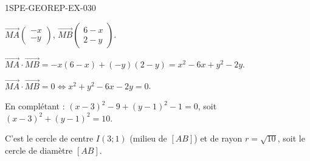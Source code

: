 \begin{corrige}{1SPE-GEOREP-EX-030}

$\vec{MA}\begin{pmatrix} -x \\ -y \end{pmatrix}$, $\vec{MB}\begin{pmatrix} 6-x \\ 2-y \end{pmatrix}$.

$\vec{MA} \cdot \vec{MB} = -x(6-x) + (-y)(2-y) = x^2 - 6x + y^2 - 2y$.

$\vec{MA} \cdot \vec{MB} = 0 \iff x^2 + y^2 - 6x - 2y = 0$.

En complétant : $(x-3)^2 - 9 + (y-1)^2 - 1 = 0$, soit $(x-3)^2 + (y-1)^2 = 10$.

C'est le cercle de centre $I(3 ; 1)$ (milieu de $[AB]$) et de rayon $r = \sqrt{10}$, soit le cercle de diamètre $[AB]$.

\end{corrige}
